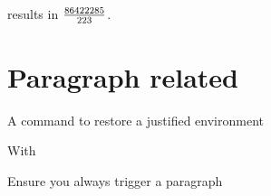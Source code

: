 \noindent results in $\frac{\rfNumer}{\rfDenom}$.


\section{Paragraph related}
A command to restore a justified environment


With \latex 

Ensure you always trigger a paragraph

\def\triggerpar{\leavevmode\@@par}%






















\makeatother



